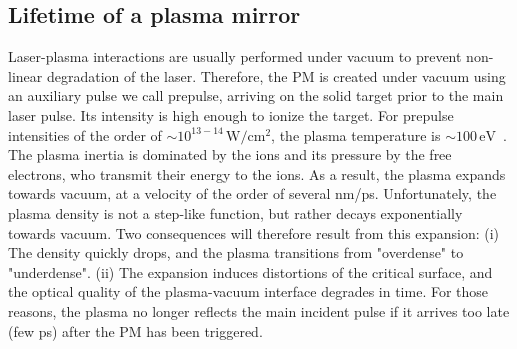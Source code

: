 %
%

\subsection{Lifetime of a plasma mirror}

Laser-plasma interactions are usually performed under vacuum to prevent non-linear degradation of the laser. Therefore, the PM is created under vacuum using an auxiliary pulse we call prepulse, arriving on the solid target prior to the main laser pulse. Its intensity is high enough to ionize the target. For prepulse intensities of the order of $\sim10^{13-14}\,\mathrm{W/cm^2}$, the plasma temperature is $\sim 100\,\mathrm{eV}$~\cite{kruer1988physics}. The plasma inertia is dominated by the ions and its pressure by the free electrons, who transmit their energy to the ions. As a result, the plasma expands towards vacuum, at a velocity of the order of several nm/ps. Unfortunately, the plasma density is not a step-like function, but rather decays exponentially towards vacuum. Two consequences will therefore result from this expansion: (i) The density quickly drops, and the plasma transitions from "overdense" to "underdense". (ii) The expansion induces distortions of the critical surface, and the optical quality of the plasma-vacuum interface degrades in time. For those reasons, the plasma no longer reflects the main incident pulse if it arrives too late (few ps) after the PM has been triggered.\\

